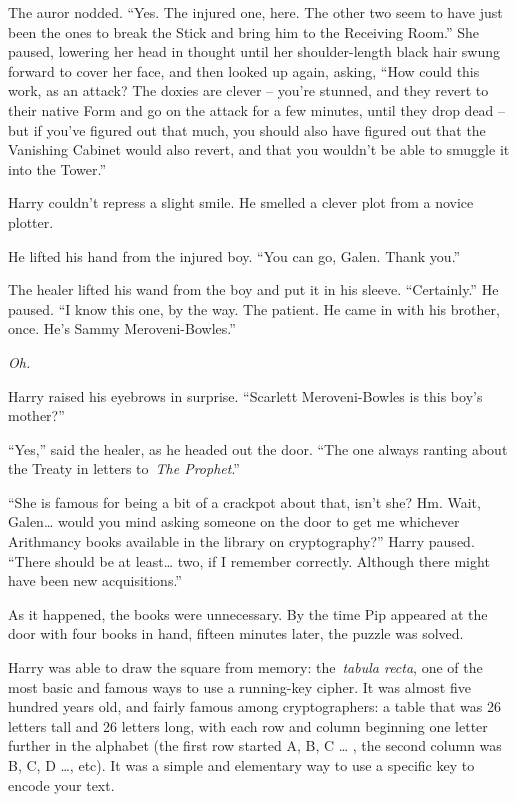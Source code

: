 The auror nodded. ``Yes. The injured one, here. The other two seem to
have just been the ones to break the Stick and bring him to the
Receiving Room.'' She paused, lowering her head in thought until her
shoulder-length black hair swung forward to cover her face, and then
looked up again, asking, ``How could this work, as an attack? The doxies
are clever -- you're stunned, and they revert to their native Form and
go on the attack for a few minutes, until they drop dead -- but if
you've figured out that much, you should also have figured out that the
Vanishing Cabinet would also revert, and that you wouldn't be able to
smuggle it into the Tower.''

Harry couldn't repress a slight smile. He smelled a clever plot from a
novice plotter.

He lifted his hand from the injured boy. ``You can go, Galen. Thank
you.''

The healer lifted his wand from the boy and put it in his sleeve.
``Certainly.'' He paused. ``I know this one, by the way. The patient. He
came in with his brother, once. He's Sammy Meroveni-Bowles.''

\emph{Oh.}

Harry raised his eyebrows in surprise. ``Scarlett Meroveni-Bowles is
this boy's mother?''

``Yes,'' said the healer, as he headed out the door. ``The one always
ranting about the Treaty in letters to~\emph{The Prophet}.''

``She is famous for being a bit of a crackpot about that, isn't she? Hm.
Wait, Galen\ldots{} would you mind asking someone on the door to get me
whichever Arithmancy books available in the library on cryptography?''
Harry paused. ``There should be at least\ldots{} two, if I remember
correctly. Although there might have been new acquisitions.''

\mybreak

As it happened, the books were unnecessary. By the time Pip appeared at
the door with four books in hand, fifteen minutes later, the puzzle was
solved.

Harry was able to draw the square from memory: the~\emph{tabula recta},
one of the most basic and famous ways to use a running-key cipher. It
was almost five hundred years old, and fairly famous among
cryptographers: a table that was 26 letters tall and 26 letters long,
with each row and column beginning one letter further in the alphabet
(the first row started A, B, C \ldots{} , the second column was B, C, D
\ldots, etc). It was a simple and elementary way to use a specific key
to encode your text.

